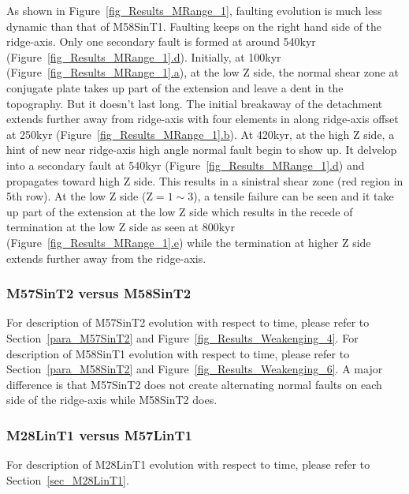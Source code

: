 As shown in Figure~\hyperref[fig_Results_MRange_1]{\ref{fig_Results_MRange_1}}, faulting evolution is much less dynamic than that of M58SinT1. Faulting keeps on the right hand side of the ridge-axis. Only one secondary fault is formed at around 540kyr (Figure~\hyperref[fig_Results_MRange_1]{\ref{fig_Results_MRange_1}.d}). Initially, at 100kyr (Figure~\hyperref[fig_Results_MRange_1]{\ref{fig_Results_MRange_1}.a}), at the low Z side, the normal shear zone at conjugate plate takes up part of the extension and leave a dent in the topography. But it doesn't last long. The initial breakaway of the detachment extends further away from ridge-axis with four elements in along ridge-axis offset at 250kyr (Figure~\hyperref[fig_Results_MRange_1]{\ref{fig_Results_MRange_1}.b}). At 420kyr, at the high Z side, a hint of new near ridge-axis high angle normal fault begin to show up. It delvelop into a secondary fault at 540kyr (Figure~\hyperref[fig_Results_MRange_1]{\ref{fig_Results_MRange_1}.d}) and propagates toward high Z side. This results in a sinistral shear zone (red region in 5th row). At the low Z side (Z$=1\sim3$), a tensile failure can be seen and it take up part of the extension at the low Z side which results in the recede of termination at the low Z side as seen at 800kyr (Figure~\hyperref[fig_Results_MRange_1]{\ref{fig_Results_MRange_1}.e}) while the termination at higher Z side extends further away from the ridge-axis.

\subsubsection{M57SinT2 versus M58SinT2}
For description of M57SinT2 evolution with respect to time, please refer to Section~\hyperref[para_M57SinT2]{\ref{para_M57SinT2}} and Figure~\hyperref[fig_Results_Weakenging_4]{\ref{fig_Results_Weakenging_4}}. For description of M58SinT1 evolution with respect to time, please refer to  Section~\hyperref[para_M58SinT2]{\ref{para_M58SinT2}} and Figure~\hyperref[fig_Results_Weakenging_6]{\ref{fig_Results_Weakenging_6}}. A major difference is that M57SinT2 does not create alternating normal faults on each side of the ridge-axis while M58SinT2 does. 

\subsubsection{M28LinT1 versus M57LinT1}
For description of M28LinT1 evolution with respect to time, please refer to Section~\hyperref[sec_M28LinT1]{\ref{sec_M28LinT1}}.
